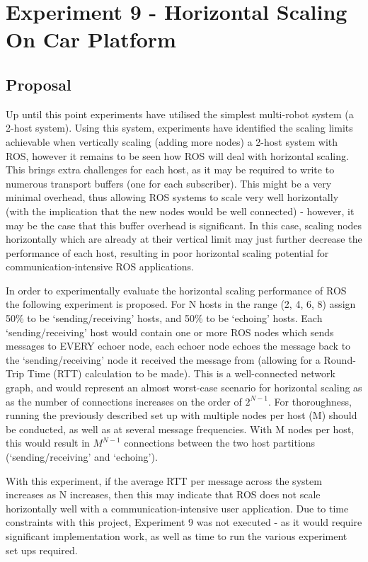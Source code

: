 \documentclass[../dissertation.tex]{subfiles}
\begin{document}
\section{Experiment 9 - Horizontal Scaling On Car Platform}
\label{experiment9-horizontal-scaling}

\subsection{Proposal}

Up until this point experiments have utilised the simplest multi-robot system (a 2-host system). Using this system, experiments have identified the scaling limits achievable when vertically scaling (adding more nodes) a 2-host system with ROS, however it remains to be seen how ROS will deal with horizontal scaling. This brings extra challenges for each host, as it may be required to write to numerous transport buffers (one for each subscriber). This might be a very minimal overhead, thus allowing ROS systems to scale very well horizontally (with the implication that the new nodes would be well connected) - however, it may be the case that this buffer overhead is significant. In this case, scaling nodes horizontally which are already at their vertical limit may just further decrease the performance of each host, resulting in poor horizontal scaling potential for communication-intensive ROS applications.

In order to experimentally evaluate the horizontal scaling performance of ROS the following experiment is proposed. For N hosts in the range (2, 4, 6, 8) assign 50\% to be `sending/receiving' hosts, and 50\% to be `echoing' hosts. Each `sending/receiving' host would contain one or more ROS nodes which sends messages to EVERY echoer node, each echoer node echoes the message back to the `sending/receiving' node it received the message from (allowing for a Round-Trip Time (RTT) calculation to be made). This is a well-connected network graph, and would represent an almost worst-case scenario for horizontal scaling as as the number of connections increases on the order of $2^{N-1}$. For thoroughness, running the previously described set up with multiple nodes per host (M) should be conducted, as well as at several message frequencies. With M nodes per host, this would result in $M^{N-1}$ connections between the two host partitions (`sending/receiving' and `echoing').

With this experiment, if the average RTT per message across the system increases as N increases, then this may indicate that ROS does not scale horizontally well with a communication-intensive user application. Due to time constraints with this project, Experiment 9 was not executed - as it would require significant implementation work, as well as time to run the various experiment set ups required.
\end{document}

